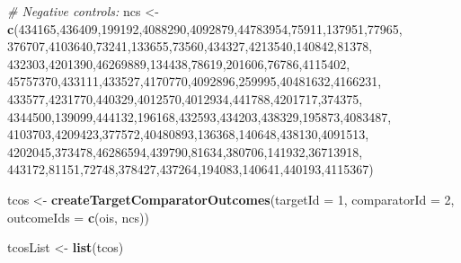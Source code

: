 \documentclass[
  11pt]{book}
\newenvironment{Shaded}{\begin{snugshade}}{\end{snugshade}}
\newcommand{\AttributeTok}[1]{\textcolor[rgb]{0.13,0.29,0.53}{#1}}
\newcommand{\CommentTok}[1]{\textcolor[rgb]{0.56,0.35,0.01}{\textit{#1}}}
\newcommand{\DecValTok}[1]{\textcolor[rgb]{0.00,0.00,0.81}{#1}}
\newcommand{\FunctionTok}[1]{\textcolor[rgb]{0.13,0.29,0.53}{\textbf{#1}}}
\newcommand{\NormalTok}[1]{#1}
\newcommand{\OtherTok}[1]{\textcolor[rgb]{0.56,0.35,0.01}{#1}}
\theoremstyle{definition}
\theoremstyle{definition}
\theoremstyle{definition}
\theoremstyle{definition}
\theoremstyle{remark}
\begin{document}
\begin{Shaded}
\begin{Highlighting}[]
\CommentTok{\# Negative controls:}
\NormalTok{ncs }\OtherTok{\textless{}{-}} \FunctionTok{c}\NormalTok{(}\DecValTok{434165}\NormalTok{,}\DecValTok{436409}\NormalTok{,}\DecValTok{199192}\NormalTok{,}\DecValTok{4088290}\NormalTok{,}\DecValTok{4092879}\NormalTok{,}\DecValTok{44783954}\NormalTok{,}\DecValTok{75911}\NormalTok{,}\DecValTok{137951}\NormalTok{,}\DecValTok{77965}\NormalTok{,}
         \DecValTok{376707}\NormalTok{,}\DecValTok{4103640}\NormalTok{,}\DecValTok{73241}\NormalTok{,}\DecValTok{133655}\NormalTok{,}\DecValTok{73560}\NormalTok{,}\DecValTok{434327}\NormalTok{,}\DecValTok{4213540}\NormalTok{,}\DecValTok{140842}\NormalTok{,}\DecValTok{81378}\NormalTok{,}
         \DecValTok{432303}\NormalTok{,}\DecValTok{4201390}\NormalTok{,}\DecValTok{46269889}\NormalTok{,}\DecValTok{134438}\NormalTok{,}\DecValTok{78619}\NormalTok{,}\DecValTok{201606}\NormalTok{,}\DecValTok{76786}\NormalTok{,}\DecValTok{4115402}\NormalTok{,}
         \DecValTok{45757370}\NormalTok{,}\DecValTok{433111}\NormalTok{,}\DecValTok{433527}\NormalTok{,}\DecValTok{4170770}\NormalTok{,}\DecValTok{4092896}\NormalTok{,}\DecValTok{259995}\NormalTok{,}\DecValTok{40481632}\NormalTok{,}\DecValTok{4166231}\NormalTok{,}
         \DecValTok{433577}\NormalTok{,}\DecValTok{4231770}\NormalTok{,}\DecValTok{440329}\NormalTok{,}\DecValTok{4012570}\NormalTok{,}\DecValTok{4012934}\NormalTok{,}\DecValTok{441788}\NormalTok{,}\DecValTok{4201717}\NormalTok{,}\DecValTok{374375}\NormalTok{,}
         \DecValTok{4344500}\NormalTok{,}\DecValTok{139099}\NormalTok{,}\DecValTok{444132}\NormalTok{,}\DecValTok{196168}\NormalTok{,}\DecValTok{432593}\NormalTok{,}\DecValTok{434203}\NormalTok{,}\DecValTok{438329}\NormalTok{,}\DecValTok{195873}\NormalTok{,}\DecValTok{4083487}\NormalTok{,}
         \DecValTok{4103703}\NormalTok{,}\DecValTok{4209423}\NormalTok{,}\DecValTok{377572}\NormalTok{,}\DecValTok{40480893}\NormalTok{,}\DecValTok{136368}\NormalTok{,}\DecValTok{140648}\NormalTok{,}\DecValTok{438130}\NormalTok{,}\DecValTok{4091513}\NormalTok{,}
         \DecValTok{4202045}\NormalTok{,}\DecValTok{373478}\NormalTok{,}\DecValTok{46286594}\NormalTok{,}\DecValTok{439790}\NormalTok{,}\DecValTok{81634}\NormalTok{,}\DecValTok{380706}\NormalTok{,}\DecValTok{141932}\NormalTok{,}\DecValTok{36713918}\NormalTok{,}
         \DecValTok{443172}\NormalTok{,}\DecValTok{81151}\NormalTok{,}\DecValTok{72748}\NormalTok{,}\DecValTok{378427}\NormalTok{,}\DecValTok{437264}\NormalTok{,}\DecValTok{194083}\NormalTok{,}\DecValTok{140641}\NormalTok{,}\DecValTok{440193}\NormalTok{,}\DecValTok{4115367}\NormalTok{)}

\NormalTok{tcos }\OtherTok{\textless{}{-}} \FunctionTok{createTargetComparatorOutcomes}\NormalTok{(}\AttributeTok{targetId =} \DecValTok{1}\NormalTok{,}
                                       \AttributeTok{comparatorId =} \DecValTok{2}\NormalTok{,}
                                       \AttributeTok{outcomeIds =} \FunctionTok{c}\NormalTok{(ois, ncs))}

\NormalTok{tcosList }\OtherTok{\textless{}{-}} \FunctionTok{list}\NormalTok{(tcos)}
\end{Highlighting}
\end{Shaded}
\end{document}
